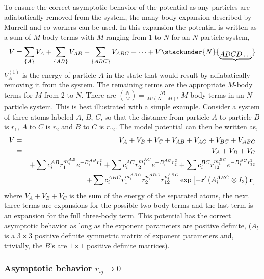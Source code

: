 To ensure the correct asymptotic behavior of the potential as any particles
are adiabatically removed from the system, the many-body expansion described
by Murrell and co-workers\cite{Murrell84} can be used. In this expansion the
potential is written as a sum of $M$-body terms with $M$ ranging from 1 to $%
N $ for an $N$ particle system, 
\begin{equation}
V=\sum_{\left\{ A\right\} }V_A+\sum_{\left\{ AB\right\}
}V_{AB}+\sum_{\left\{ ABC\right\} }V_{ABC}+\cdots +V\stackunder{N}{_{%
\underbrace{ABCD\ldots }}}
\end{equation}
$V_A^{\left( 1\right) }$ is the energy of particle $A$ in the state that
would result by adiabatically removing it from the system. The remaining
terms are the appropriate $M$-body terms for $M$ from 2 to $N$. There are $%
{N \choose M}%
=\frac{N!}{M!\left( N-M\right) !}$ $M$-body terms in an $N$ particle system.
This is best illustrated with a simple example. Consider a system of three
atoms labeled $A,\,B,\,C$, so that the distance from particle $A$ to
particle $B$ is $r_1$, $A$ to $C$ is $r_2$ and $B$ to $C$ is $r_{12}$. The
model potential can then be written as, 
\begin{eqnarray}
V &=&V_A+V_B+V_C+V_{AB}+V_{AC}+V_{BC}+V_{ABC}  \nonumber \\
&=&V_A+V_B+V_C  \nonumber \\
&&+\sum c_i^{AB}r_1^{m_i^{AB}}e^{-B_i^{AB}r_1^2}+\sum
c_i^{AC}r_2^{m_i^{AC}}e^{-B_i^{AC}r_2^2}+\sum
c_i^{BC}r_{12}^{m_i^{BC}}e^{-B_i^{BC}r_{12}^2}  \nonumber \\
&&+\sum c_i^{ABC}r_1^{m_i^{ABC}}r_2^{n_i^{ABC}}r_{12}^{p_i^{ABC}}\exp \left[
-{\bf r}^{\prime }\left( A_i^{ABC}\otimes I_3\right) {\bf r}\right]
\label{MbodyV}
\end{eqnarray}
where $V_A+V_B+V_C$ is the sum of the energy of the separated atoms, the
next three terms are expansions for the possible two-body terms and the last
term is an expansion for the full three-body term. This potential has the
correct asymptotic behavior as long as the exponent parameters are positive
definite, ($A_l$ is a $3\times 3$ positive definite symmetric matrix of
exponent parameters and, trivially, the $B$'s are $1\times 1$ positive
definite matrices).

\subsubsection{Asymptotic behavior $r_{ij}\rightarrow 0$}

